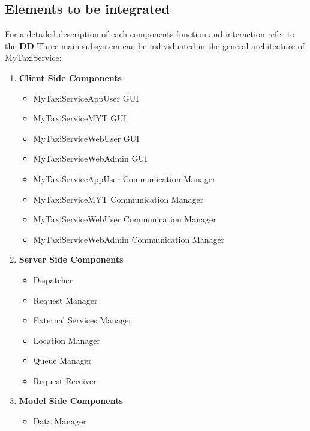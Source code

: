 \documentclass[11pt,titlepage]{article} %
\begin{document}
\subsection{Elements to be integrated}
  For a detailed description of each components function and interaction refer to the \textbf{DD} \newline
  Three main subsystem can be individuated in the general architecture of MyTaxiService:
  \begin{enumerate}
    \item \textbf{Client Side Components}
	  \begin{itemize}
	    \item MyTaxiServiceAppUser GUI
	    \item MyTaxiServiceMYT GUI
	    \item MyTaxiServiceWebUser GUI
	    \item MyTaxiServiceWebAdmin GUI
	    
	    \item MyTaxiServiceAppUser Communication Manager
	    \item MyTaxiServiceMYT Communication Manager
	    \item MyTaxiServiceWebUser Communication Manager
	    \item MyTaxiServiceWebAdmin Communication Manager
	  \end{itemize}
    
    \item \textbf{Server Side Components}
	  \begin{itemize}
	    \item Dispatcher
	    \item Request Manager
	    \item External Services Manager
	    \item Location Manager
	    \item Queue Manager
	    \item Request Receiver
	  \end{itemize}
    \item \textbf{Model Side Components}
	  \begin{itemize}
	   \item Data Manager
	  \end{itemize}

  \end{enumerate}
\end{document}
